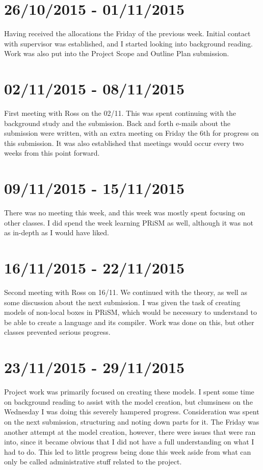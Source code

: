 \documentclass[11pt, a4paper]{article}
\begin{document}
\section{26/10/2015 - 01/11/2015}
Having received the allocations the Friday of the previous week. Initial
contact with supervisor was established, and I started looking into background
reading. Work was also put into the Project Scope and Outline Plan submission.

\section{02/11/2015 - 08/11/2015}
First meeting with Ross on the 02/11. This was spent continuing with the
background study and the submission. Back and forth e-mails about the submission
were written, with an extra meeting on Friday the 6th for progress on this
submission. It was also established that meetings would occur every two weeks
from this point forward.

\section{09/11/2015 - 15/11/2015}
There was no meeting this week, and this week was mostly spent focusing on other
classes. I did spend the week learning PRiSM as well, although it was not as
in-depth as I would have liked.

\section{16/11/2015 - 22/11/2015}
Second meeting with Ross on 16/11. We continued with the theory, as well as some
discussion about the next submission. I was given the task of creating models of
non-local boxes in PRiSM, which would be necessary to understand to be able to
create a language and its compiler. Work was done on this, but other classes
prevented serious progress.

\section{23/11/2015 - 29/11/2015}
Project work was primarily focused on creating these models. I spent some time
on background reading to assist with the model creation, but clumsiness on the
Wednesday I was doing this severely hampered progress. Consideration was spent
on the next submission, structuring and noting down parts for it. The Friday was
another attempt at the model creation, however, there were issues that were ran
into, since it became obvious that I did not have a full understanding on what I
had to do. This led to little progress being done this week aside from what can
only be called administrative stuff related to the project.
\end{document}
